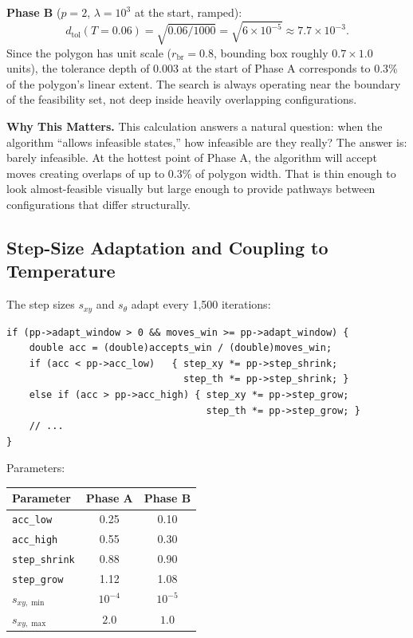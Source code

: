 \documentclass[11pt,oneside]{article}
\newcommand{\akoglu}[1]{\begin{akoglubox}\textbf{Why This Matters.} #1\end{akoglubox}}
\begin{document}
\textbf{Phase B} ($p = 2$, $\lambda = 10^3$ at the start, ramped):
\[
  d_{\mathrm{tol}}(T = 0.06) = \sqrt{0.06 / 1000} = \sqrt{6 \times 10^{-5}}
  \approx 7.7 \times 10^{-3}.
\]
Since the polygon has unit scale ($r_{\mathrm{br}} = 0.8$, bounding
box roughly $0.7 \times 1.0$ units), the tolerance depth of 0.003 at
the start of Phase A corresponds to 0.3\% of the polygon's linear
extent. The search is always operating near the boundary of the
feasibility set, not deep inside heavily overlapping configurations.

\akoglu{%
This calculation answers a natural question: when the algorithm
``allows infeasible states,'' how infeasible are they really? The
answer is: barely infeasible. At the hottest point of Phase A, the
algorithm will accept moves creating overlaps of up to 0.3\% of
polygon width. That is thin enough to look almost-feasible visually
but large enough to provide pathways between configurations that differ
structurally.%
}

\subsection{Step-Size Adaptation and Coupling to Temperature}

The step sizes $s_{xy}$ and $s_\theta$ adapt every 1{,}500 iterations:

\begin{lstlisting}[style=cstyle,caption={Adaptive step-size control in \texttt{run\_phase()}.}]
if (pp->adapt_window > 0 && moves_win >= pp->adapt_window) {
    double acc = (double)accepts_win / (double)moves_win;
    if (acc < pp->acc_low)   { step_xy *= pp->step_shrink;
                               step_th *= pp->step_shrink; }
    else if (acc > pp->acc_high) { step_xy *= pp->step_grow;
                                   step_th *= pp->step_grow; }
    // ...
}
\end{lstlisting}

Parameters:
\begin{center}
\begin{tabular}{lcc}
\toprule
Parameter & Phase A & Phase B \\
\midrule
\texttt{acc\_low}    & 0.25 & 0.10 \\
\texttt{acc\_high}   & 0.55 & 0.30 \\
\texttt{step\_shrink}& 0.88 & 0.90 \\
\texttt{step\_grow}  & 1.12 & 1.08 \\
$s_{xy,\min}$        & $10^{-4}$ & $10^{-5}$ \\
$s_{xy,\max}$        & $2.0$     & $1.0$     \\
\bottomrule
\end{tabular}
\end{center}
\end{document}
